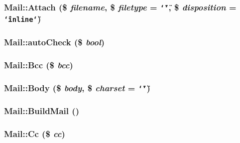 \hypertarget{classMail_a12}{
\subsubsection[Attach]{\setlength{\rightskip}{0pt plus 5cm}Mail::Attach (\$ {\em filename}, \$ {\em filetype} = {\tt \char`\"{}\char`\"{}}, \$ {\em disposition} = {\tt \char`\"{}inline\char`\"{}})}}
\label{classMail_a12}


\hypertarget{classMail_a1}{
\subsubsection[autoCheck]{\setlength{\rightskip}{0pt plus 5cm}Mail::auto\-Check (\$ {\em bool})}}
\label{classMail_a1}


\hypertarget{classMail_a8}{
\subsubsection[Bcc]{\setlength{\rightskip}{0pt plus 5cm}Mail::Bcc (\$ {\em bcc})}}
\label{classMail_a8}


\hypertarget{classMail_a9}{
\subsubsection[Body]{\setlength{\rightskip}{0pt plus 5cm}Mail::Body (\$ {\em body}, \$ {\em charset} = {\tt \char`\"{}\char`\"{}})}}
\label{classMail_a9}


\hypertarget{classMail_a13}{
\subsubsection[BuildMail]{\setlength{\rightskip}{0pt plus 5cm}Mail::Build\-Mail ()}}
\label{classMail_a13}


\hypertarget{classMail_a7}{
\subsubsection[Cc]{\setlength{\rightskip}{0pt plus 5cm}Mail::Cc (\$ {\em cc})}}
\label{classMail_a7}


